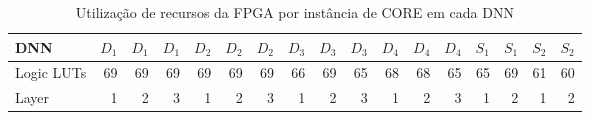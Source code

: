 \begin{table}[ht!]
\centering
\caption{Utilização de recursos da FPGA por instância de CORE em cada DNN}
\label{tab:5-vivado-core}
\begin{tabular}{lrrrrrrrrrrrrrrrr}
\toprule
DNN & $D_1$ & $D_1$ & $D_1$ & $D_2$ & $D_2$ & $D_2$ & $D_3$ & $D_3$ & $D_3$ & $D_4$ & $D_4$ & $D_4$ & $S_1$ & $S_1$ & $S_2$ & $S_2$ \\
\midrule
Logic LUTs &         69 &         69 &         69 &         69 &         69 &         69 &         66 &         69 &         65 &         68 &         68 &         65 &         65 &         69 &         61 &         60 \\
Layer & 1 & 2 & 3 & 1 & 2 & 3 & 1 & 2 & 3 & 1 & 2 & 3 & 1 & 2 & 1 & 2 \\
\bottomrule
\end{tabular}
\end{table}
